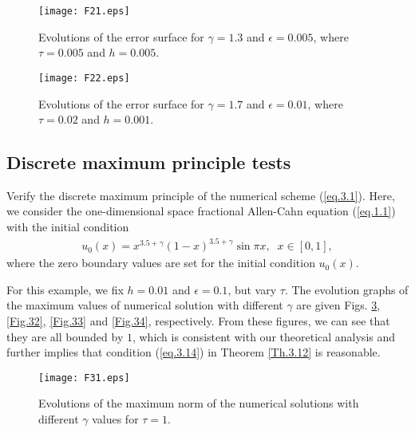 \documentclass{siamart171218}
\numberwithin{theorem}{section}
\numberwithin{equation}{section}
\begin{document}
\begin{example}
\begin{figure}[!htb]
\centering
 \texttt{[image: F21.eps]}\\
  \caption{Evolutions of the error surface for
   $\gamma=1.3$ and $\epsilon=0.005$, where $\tau=0.005$ and $h=0.005$.}\label{Fig.21}
\end{figure}

\begin{figure}[!htb]
\centering
 \texttt{[image: F22.eps]}\\
  \caption{Evolutions of the error surface for
   $\gamma=1.7$ and $\epsilon=0.01$, where $\tau=0.02$ and $h=0.001$.}\label{Fig.22}
\end{figure}

\subsection{Discrete maximum principle tests}

\begin{example}\label{Ex.3}
Verify the discrete maximum principle of the numerical scheme (\ref{eq.3.1}).
Here, we consider the one-dimensional space fractional Allen-Cahn equation (\ref{eq.1.1})
with the initial condition
\begin{equation*}
\begin{aligned}\displaystyle
u_0(x)=x^{3.5+\gamma}(1-x)^{3.5+\gamma}\sin\pi x,\;\;x\in[0,1],
\end{aligned}
\end{equation*}
where the zero boundary values are set for the initial condition $u_0(x)$.
\end{example}

For this example, we fix $h=0.01$ and $\epsilon=0.1$, but vary $\tau$.
The evolution graphs of the maximum values of numerical solution
with different $\gamma$ are given Figs. \ref{Fig.31}, \ref{Fig.32}, \ref{Fig.33}
and \ref{Fig.34}, respectively.
From these figures, we can see that they are all bounded by $1$, which is consistent
with our theoretical analysis and further implies that condition (\ref{eq.3.14}) in
Theorem \ref{Th.3.12} is reasonable.


\begin{figure}[!htb]
\centering
 \texttt{[image: F31.eps]}\\
  \caption{Evolutions of the maximum norm of the
  numerical solutions with different $\gamma$ values for $\tau=1$.}\label{Fig.31}
\end{figure}



\end{example}
\end{document}
